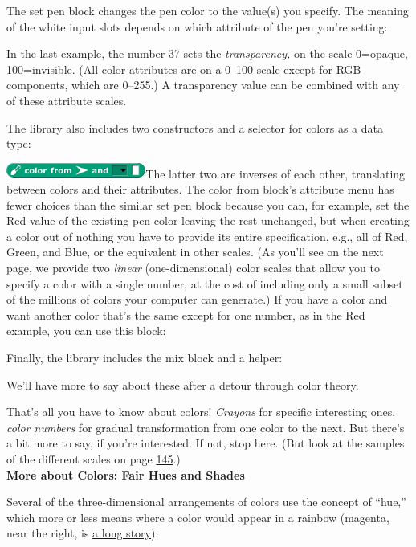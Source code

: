 The set pen block changes the pen color to the value(s) you specify. The
meaning of the white input slots depends on which attribute of the pen
you're setting:

In the last example, the number 37 sets the \emph{transparency,} on the
scale 0=opaque, 100=invisible. (All color attributes are on a 0--100
scale except for RGB components, which are 0--255.) A transparency value
can be combined with any of these attribute scales.

The library also includes two constructors and a selector for colors as
a data type:

\includegraphics[width=1.80556in,height=0.19444in]{media/image402.png}The
latter two are inverses of each other, translating between colors and
their attributes. The color from block's attribute menu has fewer
choices than the similar set pen block because you can, for example, set
the Red value of the existing pen color leaving the rest unchanged, but
when creating a color out of nothing you have to provide its entire
specification, e.g., all of Red, Green, and Blue, or the equivalent in
other scales. (As you'll see on the next page, we provide two
\emph{linear} (one-dimensional) color scales that allow you to specify a
color with a single number, at the cost of including only a small subset
of the millions of colors your computer can generate.) If you have a
color and want another color that's the same except for one number, as
in the Red example, you can use this block:

Finally, the library includes the mix block and a helper:

We'll have more to say about these after a detour through color theory.

That's all you have to know about colors! \emph{Crayons} for specific
interesting ones, \emph{color numbers} for gradual transformation from
one color to the next. But there's a bit more to say, if you're
interested. If not, stop here. (But look at the samples of the different
scales on page \hyperref[spirals]{145}.)\\
\textbf{More about Colors: Fair Hues and Shades}

Several of the three-dimensional arrangements of colors use the concept
of ``hue,'' which more or less means where a color would appear in a
rainbow (magenta, near the right, is
\href{https://en.wikipedia.org/wiki/Magenta}{a long story}):

